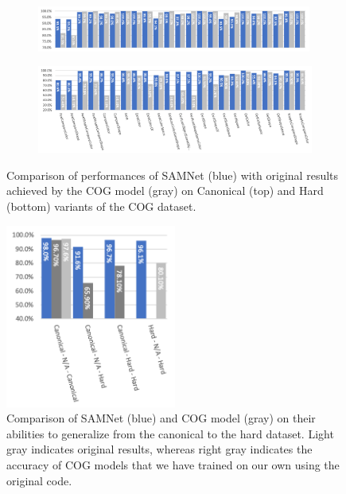 \begin{figure}
	\centering
  \begin{subfigure}{\textwidth}
    \includegraphics[width=0.99\textwidth]{results/samnet_cog_orig_canonical_no_labels.png}
  \end{subfigure}%
  \newline
  \begin{subfigure}{\textwidth}
	\includegraphics[width=\textwidth]{results/samnet_cog_orig_hard.png}
  \end{subfigure}%
\caption{Comparison of performances of SAMNet (blue) with original results achieved by the COG model (gray) on Canonical (top) and Hard (bottom) variants of the COG dataset.}
\label{fig:samnet}
\end{figure}

\begin{figure}
	\centering
	\includegraphics[width=0.5\textwidth]{results/samnet_cog_overall_transfer.png}
	\caption{Comparison of SAMNet (blue) and COG model (gray) on their abilities to generalize from the canonical to the hard dataset. Light gray indicates original results, whereas right gray indicates the accuracy of COG models that we have trained on our own using the original code.}
	\label{fig:samcell}
\end{figure}

